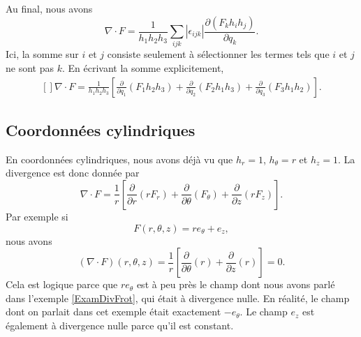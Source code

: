 Au final, nous avons
\begin{equation}
    \nabla\cdot F=\frac{1}{ h_1h_2h_3 }\sum_{ijk}| \epsilon_{ijk} |\frac{ \partial (F_kh_ih_j) }{ \partial q_k }.
\end{equation}
Ici, la somme sur $i$ et $j$ consiste seulement à sélectionner les termes tels que $i$ et $j$ ne sont pas $k$. En écrivant la somme explicitement,
\begin{equation}
    \begin{aligned}[]
        \nabla\cdot F=\frac{1}{ h_1h_2h_3 }\left[ \frac{ \partial  }{ \partial q_1 }(F_1h_2h_3)+\frac{ \partial  }{ \partial q_2 }(F_2h_1h_3)+\frac{ \partial  }{ \partial q_3 }(F_3h_1h_2) \right].
    \end{aligned}
\end{equation}

\subsection{Coordonnées cylindriques}

En coordonnées cylindriques, nous avons déjà vu que $h_r=1$, $h_{\theta}=r$ et $h_z=1$. La divergence est donc donnée par
\begin{equation}        \label{EqDivEnCylonf}
    \nabla\cdot F=\frac{1}{ r }\left[ \frac{ \partial  }{ \partial r }(rF_r)+\frac{ \partial  }{ \partial \theta }(F_{\theta})+\frac{ \partial  }{ \partial z }(rF_z) \right].
\end{equation}
Par exemple si
\begin{equation}
    F(r,\theta,z)=re_{\theta}+e_z,
\end{equation}
nous avons
\begin{equation}
    (\nabla\cdot F)(r,\theta,z)=\frac{1}{ r }\left[ \frac{ \partial  }{ \partial \theta }(r)+\frac{ \partial  }{ \partial z }(r) \right]=0.
\end{equation}
Cela est logique parce que $re_{\theta}$ est à peu près le champ dont nous avons parlé dans l'exemple \eqref{ExamDivFrot}, qui était à divergence nulle. En réalité, le champ dont on parlait dans cet exemple était exactement $-e_{\theta}$. Le champ $e_z$ est également à divergence nulle parce qu'il est constant.

